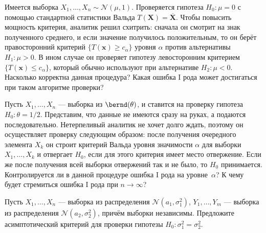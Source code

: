 \begin{problem}\label{oneside_test_problem}
    Имеется выборка $X_1, \ldots, X_n \sim \mathcal{N}(\mu, 1)$. Проверяется гипотеза $H_0\colon \mu = 0$ с помощью стандартной статистики Вальда $T(\mathbf X) = \overline{\mathbf X}$. Чтобы повысить мощность критерия, аналитик решил схитрить: сначала он смотрит на знак полученного среднего, и если значение получилось положительным, то он берёт правосторонний критерий $\{T(\mathbf{x}) \ge c_{\alpha}\}$ уровня $\alpha$ против альтернативы $H_1\colon \mu > 0$. В ином случае он проверяет гипотезу левосторонним критерием $\{T(\mathbf{x}) \le c_{\alpha}\}$, который обычно используют при альтернативе $H_2\colon \mu < 0$. Насколько корректна данная процедура? Какая ошибка I рода может достигаться при таком алгоритме проверки?
\end{problem}

\begin{problem}
    Пусть $X_1, \ldots, X_n$ --- выборка из $\bernd(\theta)$, и ставится на проверку гипотеза $H_0\colon \theta = 1/2$. Представим, что данные не имеются сразу на руках, а подаются последовательно. Нетерпеливый аналитик не хочет долго ждать, поэтому он осуществляет проверку следующим образом: после получения очередного элемента $X_k$ он строит критерий Вальда уровня значимости $\alpha$ для выборки $X_1, \ldots, X_k$ и отвергает $H_0$, если для этого критерия имеет место отвержение. Если же после получения всей выборки отвержений так и не было, то $H_0$ принимается. Контролируется ли в данной процедуре ошибка I рода на уровне~$\alpha$? К чему будет стремиться ошибка I рода при $n \to \infty$?
\end{problem}

\begin{problem}
	Пусть $X_1, \ldots , X_n$ --- выборка из распределения $\mathcal{N}(a_1, \sigma^2_1)$, $Y_1, \ldots, Y_m$ --- выборка из распределения $\mathcal{N}(a_2, \sigma^2_2)$, причём выборки независимы. Предложите асимптотический критерий для проверки гипотезы $H_0\colon \sigma^2_1 = \sigma^2_2$.
\end{problem}



